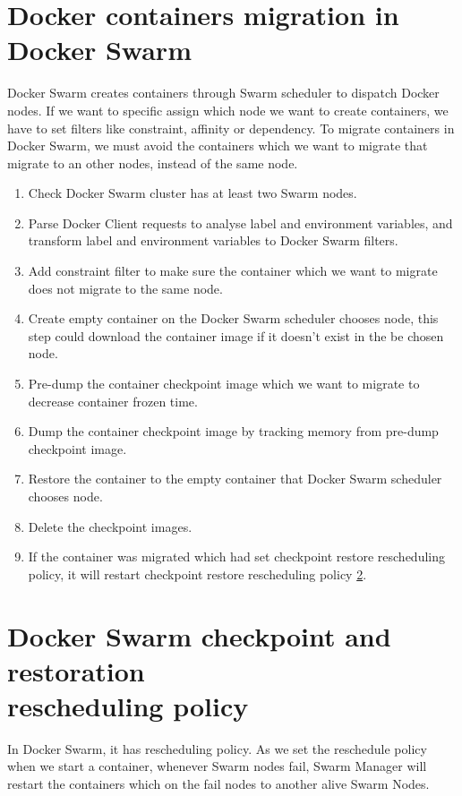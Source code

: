 \section{Docker containers migration in Docker Swarm}
Docker Swarm creates containers through Swarm scheduler to dispatch Docker nodes. If we want to specific assign which node we want to create containers, we have to set filters like constraint, affinity or dependency.
To migrate containers in Docker Swarm, we must avoid the containers which we want to migrate that migrate to an other nodes, instead of the same node.
\begin{enumerate}[Step 1.]
	\item Check Docker Swarm cluster has at least two Swarm nodes.
    \item Parse Docker Client requests to analyse label and environment variables, and transform label and environment variables to Docker Swarm filters.
    \item Add constraint filter to make sure the container which we want to migrate does not migrate to the same node.
    \item Create empty container on the Docker Swarm scheduler chooses node, this step could download the container image if it doesn't exist in the be chosen node.
    \item Pre-dump the container checkpoint image which we want to migrate to decrease container frozen time.
    \item Dump the container checkpoint image by tracking memory from pre-dump checkpoint image.
    \item Restore the container to the empty container that Docker Swarm scheduler chooses node.
    \item Delete the checkpoint images.
    \item If the container was migrated which had set checkpoint restore rescheduling policy, it will restart checkpoint restore rescheduling policy \ref{sec:checkpoint restore rescheduling policy}.
\end{enumerate}
%
%

\section{Docker Swarm checkpoint and restoration \\rescheduling policy}
\label{sec:checkpoint restore rescheduling policy}
In Docker Swarm, it has rescheduling policy. As we set the reschedule policy when we start a container, whenever Swarm nodes fail, Swarm Manager will restart the containers which on the fail nodes to another alive Swarm Nodes.

